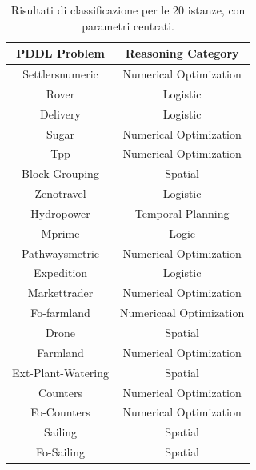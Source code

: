 \documentclass[a4paper]{article}
\begin{document}
    \begin{table}[H]
        \centering
        \renewcommand{\arraystretch}{1.25} 
        
        \begin{tabular}{c|c}
            \toprule
            
            \textbf{PDDL Problem} & \textbf{Reasoning Category} \\
            
            \midrule[1pt]
            \addlinespace[0.25cm]
            Settlersnumeric & Numerical Optimization \\
            \midrule
            Rover & Logistic \\
            \midrule
            Delivery & Logistic \\
            \midrule
            Sugar & Numerical Optimization \\
            \midrule
            Tpp & Numerical Optimization \\
            \midrule
            Block-Grouping & Spatial \\
            \midrule
            Zenotravel & Logistic \\
            \midrule
            Hydropower & Temporal Planning \\
            \midrule
            Mprime & Logic \\
            \midrule
            Pathwaysmetric & Numerical Optimization \\
            \midrule
            Expedition & Logistic \\
            \midrule
            Markettrader & Numerical Optimization \\
            \midrule
            Fo-farmland & Numericaal Optimization \\
            \midrule
            Drone & Spatial \\
            \midrule
            Farmland & Numerical Optimization \\
            \midrule
            Ext-Plant-Watering & Spatial \\
            \midrule
            Counters & Numerical Optimization \\
            \midrule
            Fo-Counters & Numerical Optimization \\
            \midrule
            Sailing & Spatial \\
            \midrule
            Fo-Sailing & Spatial \\
            
        \end{tabular}
        \vspace{0.2cm}
        \caption{Risultati di classificazione per le 20 istanze, con parametri centrati.}
        \label{tab:dati_pfile_griglia}
    \end{table}
\end{document}
